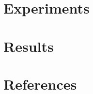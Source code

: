 \documentclass[preprint,12pt]{elsarticle}
\begin{document}




\section{Experiments}
\label{S:2}




\section{Results}
\label{S:2}


\section{References}


% 
% 







\end{document}
